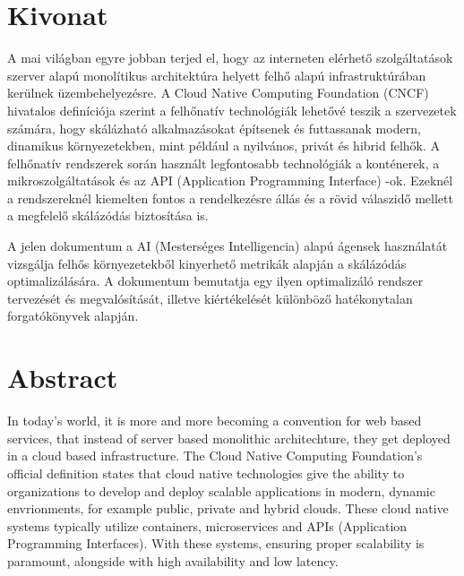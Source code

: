 \setcounter{page}{1}

\selecthungarian

\chapter*{Kivonat}

A mai világban egyre jobban terjed el, hogy az interneten elérhető szolgáltatások
 szerver alapú monolítikus architektúra helyett felhő alapú 
 infrastruktúrában kerülnek üzembehelyezésre.
 A Cloud Native Computing Foundation (CNCF) hivatalos definíciója \cite{CNCF} szerint
 a felhőnatív technológiák lehetővé teszik a szervezetek számára, hogy 
 skálázható alkalmazásokat  építsenek és futtassanak modern, dinamikus
 környezetekben, mint például a nyilvános, privát és hibrid felhők.
 A felhőnatív rendszerek során használt legfontosabb technológiák a konténerek, 
 a mikroszolgáltatások és az API (Application Programming Interface) -ok.
 Ezeknél a rendszereknél kiemelten fontos a rendelkezésre állás 
 és a rövid válaszidő mellett a megfelelő skálázódás biztosítása is.

 A jelen dokumentum a AI (Mesterséges Intelligencia) alapú ágensek használatát vizsgálja 
 felhős környezetekből kinyerhető metrikák alapján a skálázódás optimalizálására.
 A dokumentum bemutatja egy ilyen optimalizáló rendszer tervezését és megvalósítását, illetve kiértékelését
 különböző hatékonytalan forgatókönyvek alapján.







\vfill
\selectenglish


\chapter*{Abstract}

In today's world, it is more and more becoming a convention for web based services, that instead
 of server based monolithic architechture, they get deployed in a cloud based infrastructure.
 The Cloud Native Computing Foundation's official definition states that cloud native technologies give the
 ability to organizations to develop and deploy scalable applications in modern, dynamic envrionments, for example
 public, private and hybrid clouds.
 These cloud native systems typically utilize containers, microservices and APIs (Application Programming Interfaces).
 With these systems, ensuring proper scalability is paramount, alongside with high availability and low latency.

